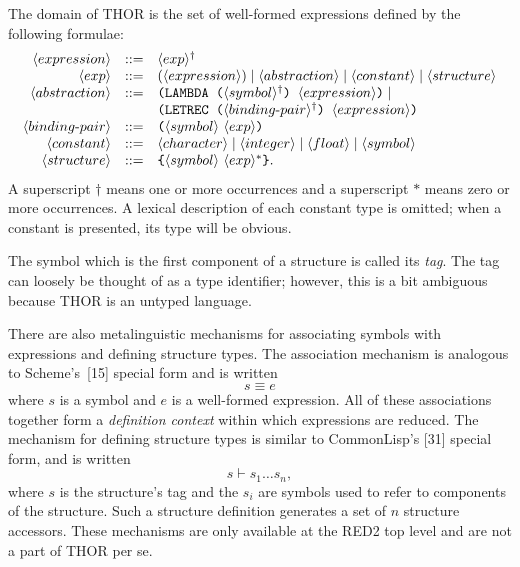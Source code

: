 The domain of THOR is the set of well-formed expressions defined by the
following formulae:
\[
\begin{array}{rcl}
\langle expression\rangle &::=& \langle exp\rangle^\dagger\\
\langle exp\rangle &::=& (\langle expression\rangle) \mid
  \langle abstraction\rangle \mid \langle constant\rangle \mid
  \langle structure\rangle\\
\langle abstraction\rangle &::=&
  \texttt{(LAMBDA (}\langle symbol\rangle^\dagger\texttt{) }
  \langle expression\rangle\texttt{)} \mid{}\\
&& \texttt{(LETREC (}\langle binding\text{-}pair\rangle^\dagger\texttt{) }
  \langle expression\rangle\texttt{)}\\
\langle binding\text{-}pair\rangle &::=&
  \texttt{(}\langle symbol\rangle\ \langle exp\rangle\texttt{)}\\
\langle constant\rangle &::=&
  \langle character\rangle \mid \langle integer\rangle \mid
  \langle float\rangle \mid \langle symbol\rangle\\
\langle structure\rangle &::=&
  \texttt{\{}\langle symbol\rangle\ \langle exp\rangle^*\texttt{\}}.
\end{array}
\]
A superscript \(\dagger\) means one or more occurrences and a superscript
\(*\) means zero or more occurrences. A lexical description of each constant
type is omitted; when a constant is presented, its type will be obvious.

The symbol which is the first component of a structure is called its \emph{tag}. The
tag can loosely be thought of as a type identifier; however, this is a bit
ambiguous because THOR is an untyped language.

There are also metalinguistic mechanisms for associating symbols with
expressions and defining structure types. The association mechanism is analogous
to Scheme's~[15]  special form and is written
\[
s \equiv e
\]
where \(s\) is a symbol and \(e\) is a well-formed expression. All of these
associations together form a \emph{definition context} within which expressions are
reduced. The mechanism for defining structure types is similar to CommonLisp's
[31]  special form, and is written
\[
s \vdash s_1\ldots s_n,
\]
where \(s\) is the structure's tag and the \(s_i\) are symbols used to refer to
components of the structure. Such a structure definition generates a set of
\(n\) structure accessors. These mechanisms are only available at the RED2 top
level and are not a part of THOR per se.

